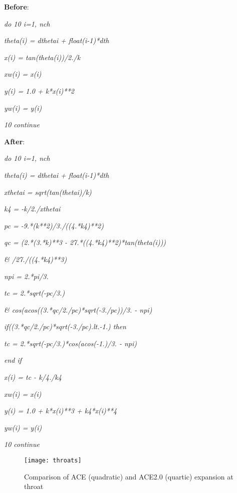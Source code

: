 \begin{singlespace}
    \textbf{Before}:

    \textit{do 10 i=1, nch}

    \textit{\; theta(i) = dthetai + float(i-1)*dth}

    \textit{\; x(i) = tan(theta(i))/2./k}

    \textit{\; xw(i) = x(i)}

    \textit{\; y(i) = 1.0 + k*x(i)**2}

    \textit{\; yw(i) = y(i)}

    \textit{10 continue}

    \textit{ }
    
    \textbf{After}:

    \textit{do 10 i=1, nch }

    \textit{\; theta(i) = dthetai + float(i-1)*dth}

    \textit{\; xthetai = sqrt(tan(thetai)/k)}

    \textit{\; k4 = -k/2./xthetai}

    \textit{\; pc = -9.*(k**2)/3./((4.*k4)**2)}

    \textit{\; qc = (2.*(3.*k)**3 - 27.*((4.*k4)**2)*tan(theta(i)))}

    \textit{\& \quad /27./((4.*k4)**3)}

    \textit{\; npi = 2.*pi/3.}

    \textit{\; tc = 2.*sqrt(-pc/3.)}

    \textit{\& \quad *cos(acos((3.*qc/2./pc)*sqrt(-3./pc))/3. - npi)}

    \textit{\; if((3.*qc/2./pc)*sqrt(-3./pc).lt.-1.) then}

    \textit{\; \qquad tc = 2.*sqrt(-pc/3.)*cos(acos(-1.)/3. - npi)}

    \textit{\; end if}

    \textit{\; x(i) = tc - k/4./k4}

    \textit{\; xw(i) = x(i)}

    \textit{\; y(i) = 1.0 + k*x(i)**3 + k4*x(i)**4}

    \textit{\; yw(i) = y(i)}

    \textit{10 continue}
\end{singlespace}

\begin{figure}[ht]
    \centering
    \texttt{[image: throats]}
    \caption{Comparison of ACE (quadratic) and ACE2.0 (quartic) expansion at throat}
    \label{fig:throats}
\end{figure}

